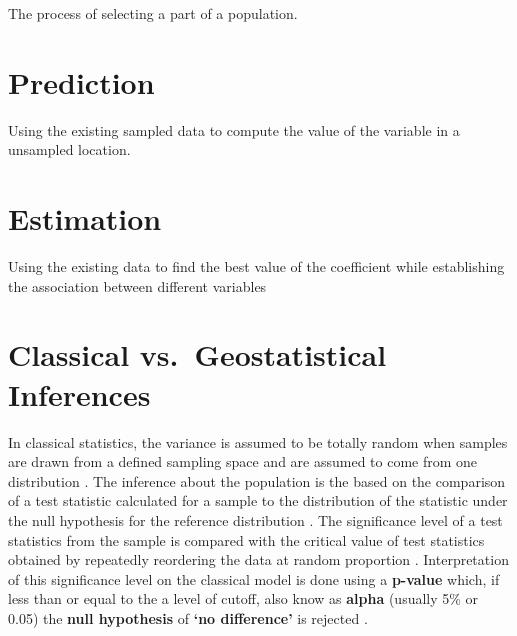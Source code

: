 \documentclass[
]{book}
\begin{document}
The process of selecting a part of a population.

\hypertarget{prediction}{%
\section{Prediction}\label{prediction}}

Using the existing sampled data to compute the value of the variable in a unsampled location.

\hypertarget{estimation}{%
\section{Estimation}\label{estimation}}

Using the existing data to find the best value of the coefficient while establishing the association between different variables

\hypertarget{classical-vs.-geostatistical-inferences}{%
\section{Classical vs.~Geostatistical Inferences}\label{classical-vs.-geostatistical-inferences}}

In classical statistics, the variance is assumed to be totally random when samples are drawn from a defined sampling space \citep{Jacquez1999} and are assumed to come from one distribution \citep{Steel1980PrinciplesAP}. The inference about the population is the based on the comparison of a test statistic calculated for a sample to the distribution of the statistic under the null hypothesis for the reference distribution \citep{Jacquez1999}. The significance level of a test statistics from the sample is compared with the critical value of test statistics obtained by repeatedly reordering the data at random proportion \citep{Jacquez1999}. Interpretation of this significance level on the classical model is done using a \textbf{p-value} which, if less than or equal to the a level of cutoff, also know as \textbf{alpha} (usually 5\% or 0.05) the \textbf{null hypothesis} of \textbf{`no difference'} is rejected \citep{Jacquez1999}.
\end{document}

